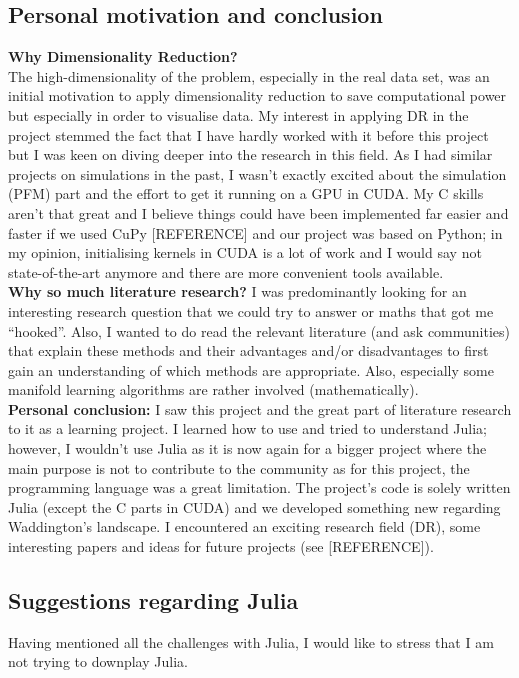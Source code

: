 \documentclass[journal, a4paper]{IEEEtran}
\begin{document}
\subsection{Personal motivation and conclusion}\label{personalconclusion}
\textbf{Why Dimensionality Reduction?}\\
The high-dimensionality of the problem, especially in the real data set, was an initial motivation to apply dimensionality reduction to save computational power but especially in order to visualise data. %
My interest in applying DR in the project stemmed the fact that I have hardly worked with it before this project but I was keen on diving deeper into the research in this field. As I had similar projects on simulations in the past, I wasn’t exactly excited about the simulation (PFM) part and the effort to get it running on a GPU in CUDA. My C skills aren’t that great and I believe things could have been implemented far easier and faster if we used CuPy [REFERENCE] and our project was based on Python; in my opinion, initialising kernels in CUDA is a lot of work and I would say not state-of-the-art anymore and there are more convenient tools available. 
\\
\textbf{Why so much literature research?}
I was predominantly looking for an interesting research question that we could try to answer or maths that got me “hooked”. Also, I wanted to do read the relevant literature (and ask communities) that explain these methods and their advantages and/or disadvantages to first gain an understanding of which methods are appropriate. Also, especially some manifold learning algorithms are rather involved (mathematically).
\\
\textbf{Personal conclusion: }
I saw this project and the great part of literature research to it as a learning project. I learned how to use and tried to understand Julia; however, I wouldn’t use Julia as it is now again for a bigger project where the main purpose is not to contribute to the community as for this project, the programming language was a great limitation.
The project’s code is solely written Julia (except the C parts in CUDA) and we developed something new regarding Waddington’s landscape. I encountered an exciting research field (DR), some interesting papers and ideas for future projects (see [REFERENCE]).


\subsection{Suggestions regarding Julia}\label{suggestionsjulia}
Having mentioned all the challenges with Julia, I would like to stress that I am not trying to downplay Julia. 
\end{document}
